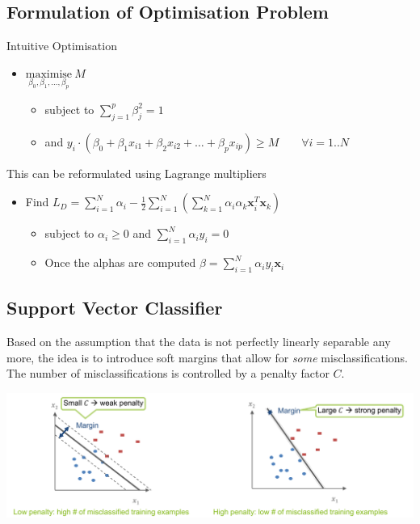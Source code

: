 \documentclass[11pt]{article}
\theoremstyle{definition}
\begin{document}
\subsection{Formulation of Optimisation Problem}
Intuitive Optimisation
\begin{itemize}[noitemsep]
	\item $\underset{\beta_0,\beta_1,\dots,\beta_p}{\text{maximise}}\ M$
	\begin{itemize}
		\item subject to $\sum_{j=1}^{p}\beta_j^2 = 1$
		\item and $y_i\cdot (\beta_0 + \beta_1 x_{i1} + \beta_2 x_{i2} + \dots + \beta_p x_{ip}) \geq M\qquad\forall i = 1..N$
	\end{itemize}
\end{itemize}
This can be reformulated using {\color{DodgerBlue2} Lagrange multipliers}
\begin{itemize}[noitemsep]
	\item Find $L_D = \sum_{i=1}^{N} \alpha_i - \frac{1}{2} \sum_{i=1}^{N}\left( \sum_{k=1}^{N} \alpha_i \alpha_k \bm{x}_i^T \bm{x}_k \right) $
		\begin{itemize}
		\item subject to $ \alpha_i \geq 0 $ and $\sum_{i=1}^{N} \alpha_i y_i = 0$
		\item Once the alphas are computed $\beta = \sum_{i=1}^{N} \alpha_i y_i \bm{x}_i$
	\end{itemize}
\end{itemize}

\subsection{Support Vector Classifier}
Based on the assumption that the data is not perfectly linearly separable any more, the idea is to introduce soft margins that allow for \emph{some} misclassifications. The number of misclassifications is controlled by a {\color{DodgerBlue2} penalty factor} $C$.

\begin{center}
	\includegraphics[width=0.7\linewidth]{img/support_vector_classifier}
\end{center}
\end{document}
